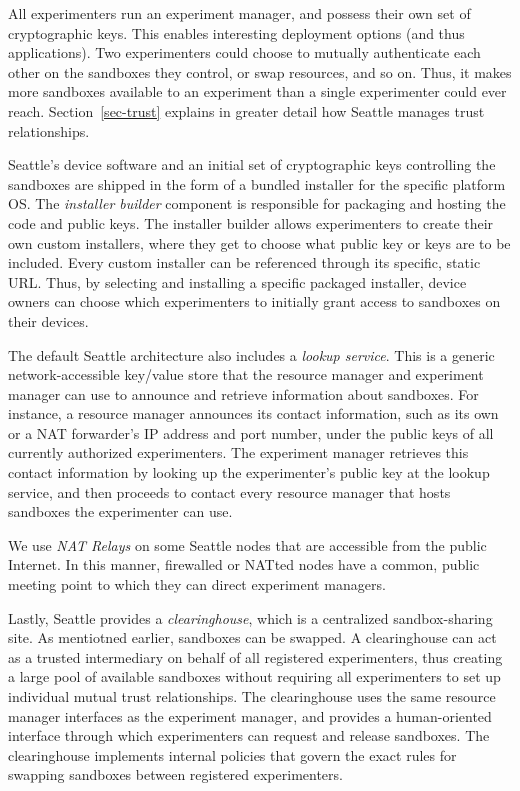 All experimenters run an experiment manager, and possess
their own set of cryptographic keys. This enables interesting
deployment options (and thus applications).
Two experimenters could choose to mutually authenticate each
other on the sandboxes they control, or swap resources, and
so on. Thus, it makes more sandboxes available to an experiment than
a single experimenter could ever reach. Section~\ref{sec-trust}
explains in greater detail how Seattle manages trust relationships.

Seattle's device software and an initial set of cryptographic
keys controlling the sandboxes are shipped in the form of a bundled
installer for the specific platform \gls{OS}.
The \textit{installer builder} component is responsible for
packaging and hosting the code and public keys.
The installer builder allows experimenters to create their own
custom installers, where they get to choose what public key or keys
are to be included. Every custom installer
can be referenced through its specific, static \gls{URL}.
Thus, by selecting and installing a specific packaged installer,
device owners can choose which experimenters to initially grant
access to sandboxes on their devices.


The default Seattle architecture also includes a
\textit{lookup service}. This is a generic network-accessible
key/value store that the resource manager and experiment manager
can use to announce and retrieve information about sandboxes.
For instance, a resource manager announces its contact information,
such as its own or a \gls{NAT} forwarder's \acrshort{IP} address and port number,
under the public keys of all currently authorized experimenters.
The experiment manager retrieves this contact information by looking up
the experimenter's public key at the lookup service, and then
proceeds to contact every resource manager that hosts sandboxes
the experimenter can use.

We use \textit{\gls{NAT} Relays} on some Seattle nodes that are
accessible from the public Internet. In this manner, firewalled
or \gls{NAT}ted nodes have a common, public meeting point to
which they can direct experiment managers.

Lastly, Seattle provides a \textit{clearinghouse}, which is a
centralized sandbox-sharing site. As mentiotned earlier,
sandboxes can be swapped. A clearinghouse can act as a trusted
intermediary on behalf of all registered experimenters, thus creating
a large pool of available sandboxes without requiring all experimenters to
set up individual mutual trust relationships.
The clearinghouse uses the same resource manager interfaces as the
experiment manager, and provides a human-oriented interface through which
experimenters can request and release sandboxes.
The clearinghouse implements internal policies
that govern the exact rules for swapping sandboxes between
registered experimenters.

